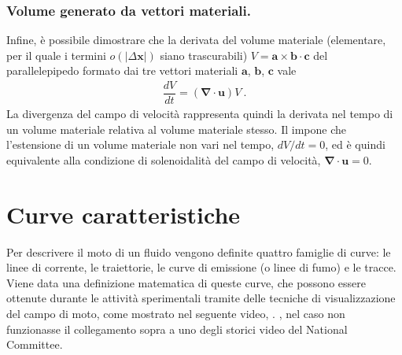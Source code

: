 \documentclass[letterpaper,10pt,italian]{jupyterBook}
\begin{document}
\subsubsection{Volume generato da vettori materiali.}
\label{\detokenize{polimi/fluidmechanics-ita/template/capitoli/03_cinematica/12teoria:volume-generato-da-vettori-materiali}}
\sphinxAtStartPar
Infine, è possibile dimostrare che la derivata del volume materiale
(elementare, per il quale i termini \(o(|\Delta \mathbf{x}|)\) siano
trascurabili) \(V = \mathbf{a} \times \mathbf{b} \cdot \mathbf{c}\) del
parallelepipedo formato dai tre vettori materiali \(\mathbf{a}\), \(\mathbf{b}\),
\(\mathbf{c}\) vale
\begin{equation*}
\begin{split}\dfrac{d V}{d t} = (\mathbf{\nabla} \cdot \mathbf{u}) V \ .\end{split}
\end{equation*}
\sphinxAtStartPar
La
divergenza del campo di velocità rappresenta quindi la derivata nel
tempo di un volume materiale relativa al volume materiale stesso. Il
 impone che l’estensione di un
volume materiale non vari nel tempo, \(dV/dt = 0\), ed è quindi
equivalente alla condizione di solenoidalità del campo di velocità,
\(\mathbf{\nabla} \cdot \mathbf{u} = 0\).


\section{Curve caratteristiche}
\label{\detokenize{polimi/fluidmechanics-ita/template/capitoli/03_cinematica/12teoria:curve-caratteristiche}}
\sphinxAtStartPar
Per descrivere il moto di un fluido vengono definite quattro famiglie di
curve: le linee di corrente, le traiettorie, le curve di emissione (o
linee di fumo) e le tracce. Viene data una definizione matematica di
queste curve, che possono essere ottenute durante le attività
sperimentali tramite delle tecniche di visualizzazione del campo di
moto, come mostrato nel seguente video, .
, nel caso non funzionasse
il collegamento sopra a uno degli storici video del National Committee.
\end{document}
